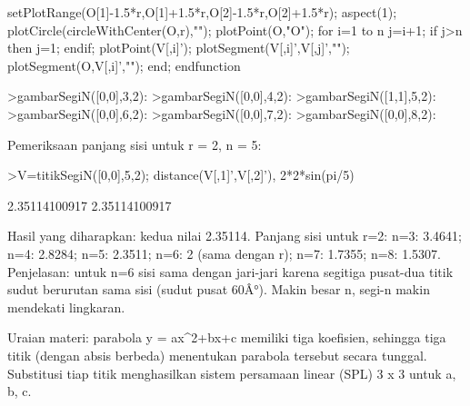 \documentclass[a4paper,10pt]{article}
\begin{document}
\begin{eulernotebook}
\begin{eulercomment}
\begin{eulercomment}
\begin{eulercomment}
\begin{eulercomment}
\begin{eulercomment}
\begin{eulercomment}
\begin{eulercomment}
\begin{eulercomment}
\begin{eulercomment}
\begin{eulercomment}
\begin{eulercomment}
\begin{eulercomment}
\begin{eulercomment}
\begin{eulercomment}
\begin{eulercomment}
\begin{eulercomment}
\begin{eulercomment}
\begin{eulercomment}
\begin{eulercomment}
\begin{eulercomment}
\begin{eulerudf}
    setPlotRange(O[1]-1.5*r,O[1]+1.5*r,O[2]-1.5*r,O[2]+1.5*r);
    aspect(1);
    plotCircle(circleWithCenter(O,r),"");
    plotPoint(O,"O");
    for i=1 to n
      j=i+1; if j>n then j=1; endif;
      plotPoint(V[,i]');
      plotSegment(V[,i]',V[,j]',"");
      plotSegment(O,V[,i]',"");
    end;
  endfunction
\end{eulerudf}
\begin{eulerprompt}
>gambarSegiN([0,0],3,2):
>gambarSegiN([0,0],4,2):
>gambarSegiN([1,1],5,2):
>gambarSegiN([0,0],6,2):
>gambarSegiN([0,0],7,2):
>gambarSegiN([0,0],8,2):
\end{eulerprompt}
\begin{eulercomment}
Pemeriksaan panjang sisi untuk r = 2, n = 5:
\end{eulercomment}
\begin{eulerprompt}
>V=titikSegiN([0,0],5,2); distance(V[,1]',V[,2]'), 2*2*sin(pi/5)
\end{eulerprompt}
\begin{euleroutput}
  2.35114100917
  2.35114100917
\end{euleroutput}
\begin{eulercomment}
Hasil yang diharapkan: kedua nilai 2.35114. Panjang sisi untuk r=2: n=3: 3.4641; n=4: 2.8284;
n=5: 2.3511; n=6: 2 (sama dengan r); n=7: 1.7355; n=8: 1.5307.
Penjelasan: untuk n=6 sisi sama dengan jari-jari karena segitiga pusat-dua titik sudut berurutan
sama sisi (sudut pusat 60Â°). Makin besar n, segi-n makin mendekati lingkaran.

\end{eulercomment}
\begin{eulercomment}
Uraian materi: parabola y = ax\textasciicircum{}2+bx+c memiliki tiga koefisien, sehingga tiga titik (dengan
absis berbeda) menentukan parabola tersebut secara tunggal. Substitusi tiap titik menghasilkan
sistem persamaan linear (SPL) 3 x 3 untuk a, b, c.


\end{eulercomment}
\end{eulercomment}
\end{eulercomment}
\end{eulercomment}
\end{eulercomment}
\end{eulercomment}
\end{eulercomment}
\end{eulercomment}
\end{eulercomment}
\end{eulercomment}
\end{eulercomment}
\end{eulercomment}
\end{eulercomment}
\end{eulercomment}
\end{eulercomment}
\end{eulercomment}
\end{eulercomment}
\end{eulercomment}
\end{eulercomment}
\end{eulercomment}
\end{eulercomment}
\end{eulernotebook}
\end{document}
